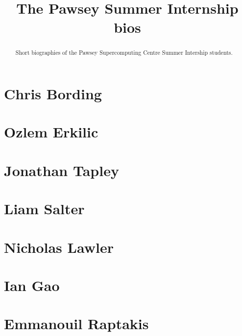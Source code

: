 \documentclass[11pt,a4paper]{report}
\title{The Pawsey Summer Internship bios}
\begin{document}
\maketitle
\tableofcontents


\begin{abstract}

Short biographies of the Pawsey Supercomputing Centre Summer Intership students.

\end{abstract}

\chapter{Chris Bording}



\chapter{Ozlem Erkilic}


\chapter{Jonathan Tapley}


\chapter{Liam Salter}


\chapter{Nicholas Lawler}



\chapter{Ian Gao}


\chapter{Emmanouil Raptakis}

\end{document}
